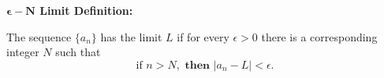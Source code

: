 \textbf{\(\boldsymbol{\epsilon - N}\) Limit Definition:}

The sequence \(\lbrace a_n\rbrace\) has the limit \(L\) if for every \(\epsilon>0\) there is a corresponding integer \(N\) such that\\
\[
\text{if } n > N, \textbf{ then } |a_n - L| < \epsilon.
\]
~\\


%
%
%


